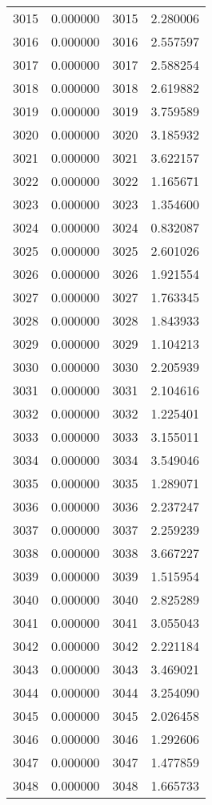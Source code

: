 \documentclass[12pt]{article}
\begin{document}
\begin{longtable}{@{}cccc@{}}
3015 & 0.000000 & 3015 & 2.280006 \\
3016 & 0.000000 & 3016 & 2.557597 \\
3017 & 0.000000 & 3017 & 2.588254 \\
3018 & 0.000000 & 3018 & 2.619882 \\
3019 & 0.000000 & 3019 & 3.759589 \\
3020 & 0.000000 & 3020 & 3.185932 \\
3021 & 0.000000 & 3021 & 3.622157 \\
3022 & 0.000000 & 3022 & 1.165671 \\
3023 & 0.000000 & 3023 & 1.354600 \\
3024 & 0.000000 & 3024 & 0.832087 \\
3025 & 0.000000 & 3025 & 2.601026 \\
3026 & 0.000000 & 3026 & 1.921554 \\
3027 & 0.000000 & 3027 & 1.763345 \\
3028 & 0.000000 & 3028 & 1.843933 \\
3029 & 0.000000 & 3029 & 1.104213 \\
3030 & 0.000000 & 3030 & 2.205939 \\
3031 & 0.000000 & 3031 & 2.104616 \\
3032 & 0.000000 & 3032 & 1.225401 \\
3033 & 0.000000 & 3033 & 3.155011 \\
3034 & 0.000000 & 3034 & 3.549046 \\
3035 & 0.000000 & 3035 & 1.289071 \\
3036 & 0.000000 & 3036 & 2.237247 \\
3037 & 0.000000 & 3037 & 2.259239 \\
3038 & 0.000000 & 3038 & 3.667227 \\
3039 & 0.000000 & 3039 & 1.515954 \\
3040 & 0.000000 & 3040 & 2.825289 \\
3041 & 0.000000 & 3041 & 3.055043 \\
3042 & 0.000000 & 3042 & 2.221184 \\
3043 & 0.000000 & 3043 & 3.469021 \\
3044 & 0.000000 & 3044 & 3.254090 \\
3045 & 0.000000 & 3045 & 2.026458 \\
3046 & 0.000000 & 3046 & 1.292606 \\
3047 & 0.000000 & 3047 & 1.477859 \\
3048 & 0.000000 & 3048 & 1.665733 \\

\end{longtable}
\end{document}
